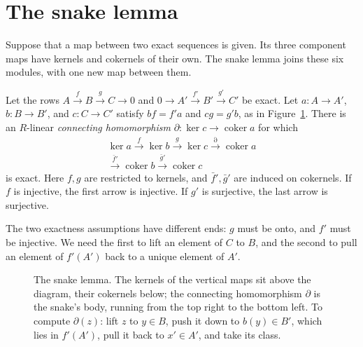 \section{The snake lemma}

Suppose that a map between two exact sequences is given. Its three component maps have kernels and cokernels of their own. The snake lemma joins these six modules, with one new map between them.

\begin{theorem}\label{thm:snake}
Let the rows $A\xrightarrow f B\xrightarrow g C\to0$ and $0\to A'\xrightarrow{f'}B'\xrightarrow{g'}C'$ be exact. Let $a\colon A\to A'$, $b\colon B\to B'$, and $c\colon C\to C'$ satisfy $bf=f'a$ and $cg=g'b$, as in Figure~\ref{fig:snake}. There is an $R$-linear \emph{connecting homomorphism} $\partial\colon\ker c\to\operatorname{coker}a$ for which
\[
\begin{gathered}
\ker a\xrightarrow f\ker b\xrightarrow g\ker c
\xrightarrow{\partial}\operatorname{coker}a\\
\xrightarrow{\bar f'}\operatorname{coker}b
\xrightarrow{\bar g'}\operatorname{coker}c
\end{gathered}
\]
is exact. Here $f,g$ are restricted to kernels, and $\bar f',\bar g'$ are induced on cokernels. If $f$ is injective, the first arrow is injective. If $g'$ is surjective, the last arrow is surjective.
\end{theorem}

The two exactness assumptions have different ends: $g$ must be onto, and $f'$ must be injective. We need the first to lift an element of $C$ to $B$, and the second to pull an element of $f'(A')$ back to a unique element of $A'$.

\begin{figure}[ht]
\centering
{}
\caption{The snake lemma. The kernels of the vertical maps sit above the diagram, their cokernels below; the connecting homomorphism $\partial$ is the snake's body, running from the
top right to the bottom left. To compute $\partial(z)$: lift $z$ to $y\in B$, push it down to $b(y)\in B'$, which lies in $f'(A')$, pull it back to $x'\in A'$, and take its class.}
\label{fig:snake}
\end{figure}

